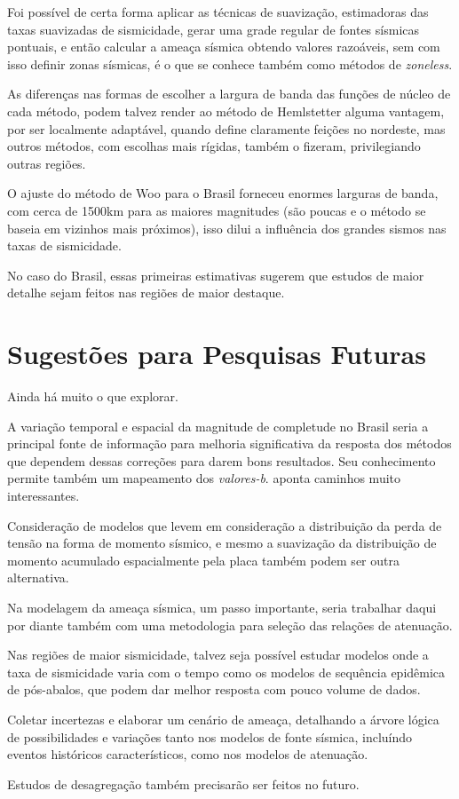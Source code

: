 Foi possível de certa forma aplicar as técnicas de suavização, estimadoras das taxas suavizadas de sismicidade, 
gerar uma grade regular de fontes sísmicas pontuais, e então calcular a ameaça sísmica obtendo 
valores razoáveis, sem com isso definir zonas sísmicas, é o que se conhece também como métodos de \emph{zoneless}.

As diferenças nas formas de escolher a largura de banda das funções de núcleo de cada método,
podem talvez render ao método de Hemlstetter alguma vantagem, por ser localmente adaptável,
quando define claramente feições no nordeste, mas outros métodos, com escolhas mais rígidas,
também o fizeram, privilegiando outras regiões.

O ajuste do método de Woo para o Brasil forneceu enormes larguras de banda, com cerca de 1500km para
as maiores magnitudes (são poucas e o método se baseia em vizinhos mais próximos), isso dilui
a influência dos grandes sismos nas taxas de sismicidade.

No caso do Brasil, essas primeiras estimativas sugerem que estudos de maior detalhe 
sejam feitos nas regiões de maior destaque.



\section{Sugestões para Pesquisas Futuras} 

Ainda há muito o que explorar.

A variação temporal e espacial da magnitude de completude no Brasil seria a principal fonte de informação 
para melhoria significativa da resposta dos métodos que dependem dessas correções para darem bons resultados.
Seu conhecimento permite também um mapeamento dos \emph{valores-b}. \citet{vorobieva_2013} aponta caminhos muito
interessantes.

Consideração de modelos que levem em consideração a distribuição da perda de tensão na forma de momento sísmico,
e mesmo a suavização da distribuição de momento acumulado espacialmente pela placa também podem ser outra alternativa.

Na modelagem da ameaça sísmica, um passo importante, seria trabalhar daqui por diante também com uma metodologia
para seleção das relações de atenuação.

Nas regiões de maior sismicidade, talvez seja possível estudar modelos onde a taxa de sismicidade varia com o tempo
como os modelos de sequência epidêmica de pós-abalos, que podem dar melhor resposta com pouco volume de dados.

Coletar incertezas e elaborar um cenário de ameaça,
detalhando a árvore lógica de possibilidades e variações
tanto nos modelos de fonte sísmica, incluíndo eventos históricos característicos, 
como nos modelos de atenuação. 

Estudos de desagregação \citep{pagani_2007} também precisarão ser feitos no futuro.

